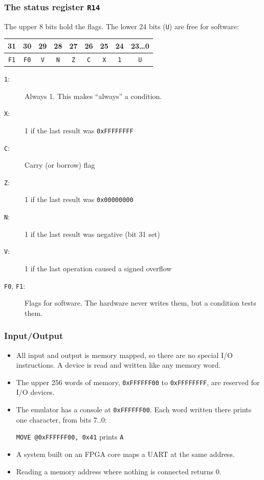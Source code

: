 \documentclass{beamer}
\newcommand{\code}[1]{\texttt{#1}}
\begin{document}
   \begin{frame}
    \frametitle{The status register \code{R14}}
    The upper 8 bits hold the flags. The lower 24 bits (\code{U}) are
    free for software:
    \begin{center}
     \begin{tabular}{|c|c|c|c|c|c|c|c||c|}
      \hline
       31&30&29&28&27&26&25&24&23\dots 0\\
      \hline
       \code{F1}&\code{F0}&\code{V}&\code{N}&\code{Z}&\code{C}&\code{X}&\code{1}&\code{U}\\
      \hline
     \end{tabular}
    \end{center}
    \begin{description}
     \item [\code{1}:] Always 1. This makes ``always'' a condition.
     \item [\code{X}:] 1 if the last result was \code{0xFFFFFFFF}
     \item [\code{C}:] Carry (or borrow) flag
     \item [\code{Z}:] 1 if the last result was \code{0x00000000}
     \item [\code{N}:] 1 if the last result was negative (bit 31 set)
     \item [\code{V}:] 1 if the last operation caused a signed overflow
     \item [\code{F0}, \code{F1}:] Flags for software. The hardware
      never writes them, but a condition tests them.
    \end{description}
   \end{frame}
%
   \begin{frame}
    \frametitle{Input/Output}
    \begin{itemize}
     \item All input and output is memory mapped, so there are no special
      I/O instructions. A device is read and written like any memory word.
     \item The upper 256 words of memory, \code{0xFFFFFF00} to
      \code{0xFFFFFFFF}, are reserved for I/O devices.
     \item The emulator has a console at \code{0xFFFFFF00}. Each word
      written there prints one character, from bits 7..0:
      \begin{center}
       \code{MOVE @0xFFFFFF00, 0x41} \quad prints \code{A}
      \end{center}
     \item A system built on an FPGA core maps a UART at the same address.
     \item Reading a memory address where nothing is connected returns 0.
    \end{itemize}
   \end{frame}
\end{document}
